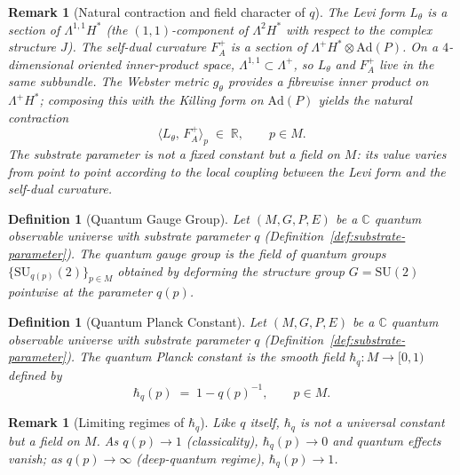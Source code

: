 \documentclass[12pt,a4paper]{report}
\newtheorem{definition}[theorem]{Definition}
\newtheorem{remark}[theorem]{Remark}
\begin{document}
\begin{remark}[Natural contraction and field character of $q$]
\label{rem:substrate-contraction}
The Levi form $L_\theta$ is a section of $\Lambda^{1,1} H^*$
(the $(1,1)$-component of $\Lambda^2 H^*$ with respect to the complex
structure $J$).  The self-dual curvature $F_A^+$ is a section of
$\Lambda^+ H^* \otimes \mathrm{Ad}(P)$.  On a $4$-dimensional oriented
inner-product space, $\Lambda^{1,1} \subset \Lambda^+$, so $L_\theta$ and
$F_A^+$ live in the same subbundle.  The Webster metric $g_\theta$
provides a fibrewise inner product on $\Lambda^+ H^*$; composing this
with the Killing form on $\mathrm{Ad}(P)$ yields the natural contraction
\[
  \langle L_\theta,\, F_A^+ \rangle_p
  \;\in\; \mathbb{R}, \qquad p \in M.
\]
The substrate parameter is not a
fixed constant but a field on $M$: its value varies from point to point
according to the local coupling between the Levi form and the self-dual
curvature.
\end{remark}

\begin{definition}[Quantum Gauge Group]
\label{def:quantum-gauge-group}
Let $(M, G, P, E)$ be a $\mathbb{C}$ quantum observable universe with substrate
parameter $q$ (Definition~\ref{def:substrate-parameter}).  The
\emph{quantum gauge group} is the field of quantum groups
$\{\mathrm{SU}_{q(p)}(2)\}_{p \in M}$ obtained by deforming the structure
group $G = \mathrm{SU}(2)$ pointwise at the parameter $q(p)$.
\end{definition}

\begin{definition}[Quantum Planck Constant]
\label{def:quantum-planck-constant}
Let $(M, G, P, E)$ be a $\mathbb{C}$ quantum observable universe with substrate
parameter $q$ (Definition~\ref{def:substrate-parameter}).  The
\emph{quantum Planck constant} is the smooth field
$\hbar_q \colon M \to [0,1)$ defined by
\[
  \hbar_q(p) \;=\; 1 - q(p)^{-1}, \qquad p \in M.
\]
\end{definition}

\begin{remark}[Limiting regimes of $\hbar_q$]
\label{rem:planck-limits}
Like $q$ itself, $\hbar_q$ is not a universal constant but a field on $M$.
As $q(p) \to 1$ (classicality), $\hbar_q(p) \to 0$ and quantum effects
vanish; as $q(p) \to \infty$ (deep-quantum regime), $\hbar_q(p) \to 1$.
\end{remark}
\end{document}
